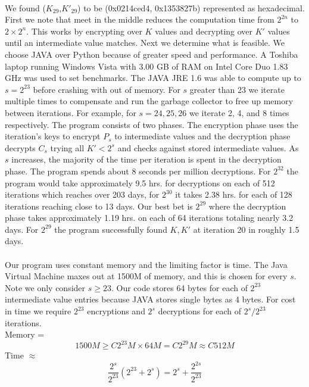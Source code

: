 \documentclass[11pt]{article}
\begin{document}
\paragraph{}
We found ($K_{29}$,$K'_{29}$) to be (0x0214ced4, 0x1353827b) represented
as hexadecimal. First we note 
that meet in the middle reduces the computation time
from $2^{2n}$ to $2\times2^n$. This works by encrypting over
$K$ values and decrypting over $K'$ values until an intermediate value
matches. Next we determine what is feasible. We choose JAVA over Python
because of greater speed and performance. A Toshiba laptop running
Windows Vista with 3.00 GB of RAM on Intel Core Duo 1.83 GHz was used to set
benchmarks. The JAVA JRE 1.6 was able to compute up to $s = 2^{23}$ before
crashing with out of memory. For $s$ greater than 23 we iterate multiple
times to compensate and run the garbage collector to free up memory
between iterations. For example, for $s = 24,25,26$ we iterate 2, 4, and 8
times respectively. The program consists of two phases. The encryption
phase uses the iteration's keys to encrypt $P_s$ to intermediate values and the
decryption phase decrypts $C_s$ trying all $K' < 2^s$ and checks against
stored intermediate values. As $s$ increases, the majority of the time
per iteration is spent in the decryption phase. The program spends about
8 seconds per million decryptions. For $2^{32}$ the program would take
approximately 9.5 hrs. for decryptions on each of 512 iterations which reaches
over 203 days, for $2^{30}$ it takes 2.38 hrs. for each of 128
iterations reaching close to 13 days. Our best bet is $2^{29}$ where the
decryption phase takes approximately 1.19 hrs. on each of 64 iterations
totaling nearly 3.2 days. For $2^{29}$ the program successfully found
$K,K'$ at iteration 20 in roughly 1.5 days. 

\paragraph{}
Our program uses constant memory and the
limiting factor is time. The Java Virtual Machine maxes out at 1500M of
memory, and this is chosen for every $s$. Note we only consider $s \geq
23$. Our code stores 64 bytes for each of $2^{23}$ intermediate value
entries because JAVA stores single bytes as 4 bytes. 
For cost in time we require $2^{23}$ encryptions and $2^s$ decryptions
for each of $2^s/2^{23}$ iterations. \\

Memory = 
\begin{equation}
1500M  \geq C2^{23}M \times 64M = C2^{29}M \approx C512M
\end{equation}
Time $\approx$ 
\begin{equation}
\frac{2^s}{2^{23}}(2^{23} + 2^s) = 2^s + \frac{2^{2s}}{2^{23}}
\end{equation}
\end{document}
